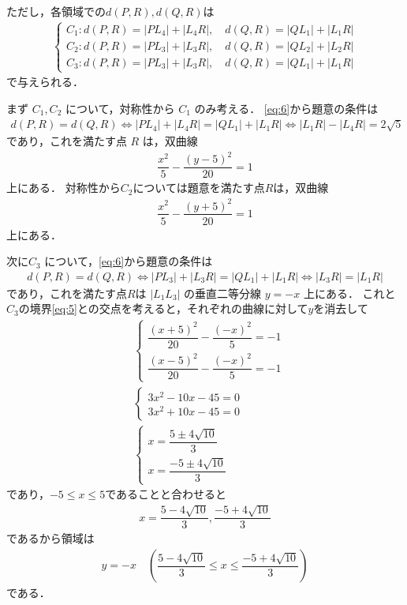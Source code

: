 \documentclass[../../main.tex]{subfiles}
\begin{document}
ただし，各領域での$d(P,R),d(Q,R)$は
\begin{align}
  \begin{cases}
    C_1 : d(P,R) = |PL_4| + |L_4R|, \quad d(Q,R) = |QL_1| + |L_1R| \\
    C_2 : d(P,R) = |PL_3| + |L_3R|, \quad d(Q,R) = |QL_2| + |L_2R| \\
    C_3 : d(P,R) = |PL_3| + |L_3R|, \quad d(Q,R) = |QL_1| + |L_1R|
  \end{cases} \label{eq:6}
\end{align}
で与えられる．

まず $C_1, C_2$ について，対称性から $C_1$ のみ考える．
\cref{eq:6}から題意の条件は
\begin{align}
  d(P,R) = d(Q,R) \iff |PL_4| + |L_4R| = |QL_1| + |L_1R| \iff |L_1R| - |L_4R| = 2\sqrt{5}
\end{align}
であり，これを満たす点 $R$ は，双曲線
\begin{align}
  \dfrac{x^2}{5} - \dfrac{(y-5)^2}{20} = 1 \label{eq:7}
\end{align}
上にある．
対称性から$C_2$については題意を満たす点$R$は，双曲線
\begin{align}
  \dfrac{x^2}{5} - \dfrac{(y+5)^2}{20} = 1 \label{eq:8}
\end{align}
上にある．

次に$C_3$ について，\cref{eq:6}から題意の条件は
\begin{align}
  d(P,R) = d(Q,R) \iff |PL_3| + |L_3R| = |QL_1| + |L_1R| \iff |L_3R| = |L_1R|
\end{align}
であり，これを満たす点$R$は $|L_1L_3|$ の垂直二等分線 $y = -x$ 上にある．
これと$C_3$の境界\cref{eq:5}との交点を考えると，それぞれの曲線に対して$y$を消去して
\begin{align}
  &
  \begin{cases}
    \dfrac{(x+5)^2}{20} - \dfrac{(-x)^2}{5} = -1 \\
    \dfrac{(x-5)^2}{20} - \dfrac{(-x)^2}{5} = -1
  \end{cases} \\
  &
  \begin{cases}
    3x^2 - 10x - 45 = 0 \\
    3x^2 + 10x - 45  = 0
  \end{cases} \\
  &
  \begin{cases}
    x = \dfrac{5 \pm 4\sqrt{10}}{3} \\
    x = \dfrac{-5 \pm 4\sqrt{10}}{3}
  \end{cases}
\end{align}
であり，$-5 \le x \le 5$であることと合わせると
\begin{align}
  x = \dfrac{5 - 4\sqrt{10}}{3}, \dfrac{-5 + 4\sqrt{10}}{3}
\end{align}
であるから領域は
\begin{align}
  y = -x \quad \left(\dfrac{5 - 4\sqrt{10}}{3} \le x \le \dfrac{-5 + 4\sqrt{10}}{3}\right) \label{eq:9}
\end{align}
である．
\end{document}
